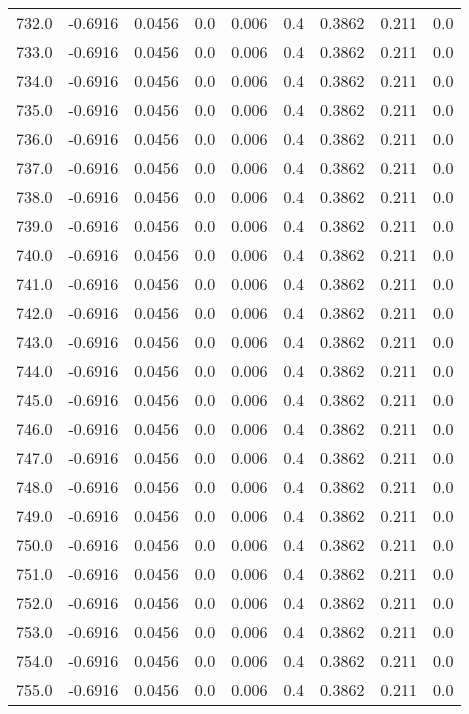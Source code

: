 \begin{longtable}{lrrrrrrrr}
732.0 & -0.6916 & 0.0456 & 0.0 & 0.006 & 0.4 & 0.3862 & 0.211 & 0.0 \\
733.0 & -0.6916 & 0.0456 & 0.0 & 0.006 & 0.4 & 0.3862 & 0.211 & 0.0 \\
734.0 & -0.6916 & 0.0456 & 0.0 & 0.006 & 0.4 & 0.3862 & 0.211 & 0.0 \\
735.0 & -0.6916 & 0.0456 & 0.0 & 0.006 & 0.4 & 0.3862 & 0.211 & 0.0 \\
736.0 & -0.6916 & 0.0456 & 0.0 & 0.006 & 0.4 & 0.3862 & 0.211 & 0.0 \\
737.0 & -0.6916 & 0.0456 & 0.0 & 0.006 & 0.4 & 0.3862 & 0.211 & 0.0 \\
738.0 & -0.6916 & 0.0456 & 0.0 & 0.006 & 0.4 & 0.3862 & 0.211 & 0.0 \\
739.0 & -0.6916 & 0.0456 & 0.0 & 0.006 & 0.4 & 0.3862 & 0.211 & 0.0 \\
740.0 & -0.6916 & 0.0456 & 0.0 & 0.006 & 0.4 & 0.3862 & 0.211 & 0.0 \\
741.0 & -0.6916 & 0.0456 & 0.0 & 0.006 & 0.4 & 0.3862 & 0.211 & 0.0 \\
742.0 & -0.6916 & 0.0456 & 0.0 & 0.006 & 0.4 & 0.3862 & 0.211 & 0.0 \\
743.0 & -0.6916 & 0.0456 & 0.0 & 0.006 & 0.4 & 0.3862 & 0.211 & 0.0 \\
744.0 & -0.6916 & 0.0456 & 0.0 & 0.006 & 0.4 & 0.3862 & 0.211 & 0.0 \\
745.0 & -0.6916 & 0.0456 & 0.0 & 0.006 & 0.4 & 0.3862 & 0.211 & 0.0 \\
746.0 & -0.6916 & 0.0456 & 0.0 & 0.006 & 0.4 & 0.3862 & 0.211 & 0.0 \\
747.0 & -0.6916 & 0.0456 & 0.0 & 0.006 & 0.4 & 0.3862 & 0.211 & 0.0 \\
748.0 & -0.6916 & 0.0456 & 0.0 & 0.006 & 0.4 & 0.3862 & 0.211 & 0.0 \\
749.0 & -0.6916 & 0.0456 & 0.0 & 0.006 & 0.4 & 0.3862 & 0.211 & 0.0 \\
750.0 & -0.6916 & 0.0456 & 0.0 & 0.006 & 0.4 & 0.3862 & 0.211 & 0.0 \\
751.0 & -0.6916 & 0.0456 & 0.0 & 0.006 & 0.4 & 0.3862 & 0.211 & 0.0 \\
752.0 & -0.6916 & 0.0456 & 0.0 & 0.006 & 0.4 & 0.3862 & 0.211 & 0.0 \\
753.0 & -0.6916 & 0.0456 & 0.0 & 0.006 & 0.4 & 0.3862 & 0.211 & 0.0 \\
754.0 & -0.6916 & 0.0456 & 0.0 & 0.006 & 0.4 & 0.3862 & 0.211 & 0.0 \\
755.0 & -0.6916 & 0.0456 & 0.0 & 0.006 & 0.4 & 0.3862 & 0.211 & 0.0 \\

\end{longtable}
